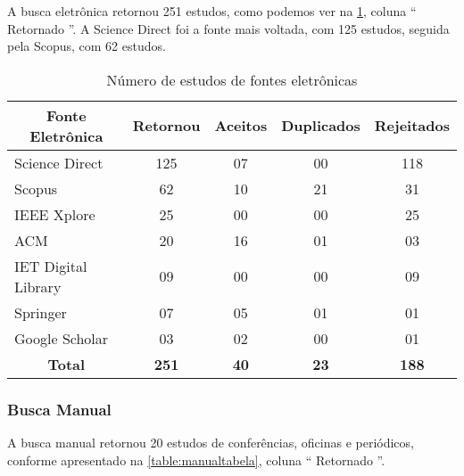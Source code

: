 A busca eletrônica retornou 251 estudos, como podemos ver na \ref{table:buscaauto}, coluna `` Retornado ''. A Science Direct foi a fonte mais voltada, com 125 estudos, seguida pela Scopus, com 62 estudos.

\begin{table}[!ht]
	\centering
	\scriptsize
	\caption{Número de estudos de fontes eletrônicas}
	\label{table:buscaauto}	
	\begin{tabular}{l|c|c|c|c}
		\hline \hline
		\multicolumn{1}{c|}{\textbf{Fonte Eletrônica}} & \textbf{Retornou} & \textbf{Aceitos} & \textbf{Duplicados} & \textbf{Rejeitados} \\\hline \hline
		Science Direct 																	& 125 							& 07 								& 00 									& 118 \\\hline
		Scopus 																					& 62 								& 10 								& 21 									& 31 \\\hline
		IEEE Xplore 																		& 25 								& 00 								& 00 									& 25 \\\hline
		ACM 																						& 20 								& 16 								& 01 									& 03 \\\hline
		IET Digital Library 														& 09 								& 00 								& 00 									& 09 \\\hline
		Springer 																				& 07 								& 05 								& 01 									& 01 \\\hline			
		Google Scholar 																	& 03 								& 02 								& 00 									& 01 \\\hline
		\multicolumn{1}{c|}{\textbf{Total}} 						& \textbf{251} 			& \textbf{40} 			& \textbf{23} 				& \textbf{188} \\\hline 
		\hline
	\end{tabular}	
\end{table}

\subsubsection{Busca Manual}

A busca manual retornou 20 estudos de conferências, oficinas e periódicos, conforme apresentado na \ref{table:manualtabela}, coluna `` Retornado ''.


